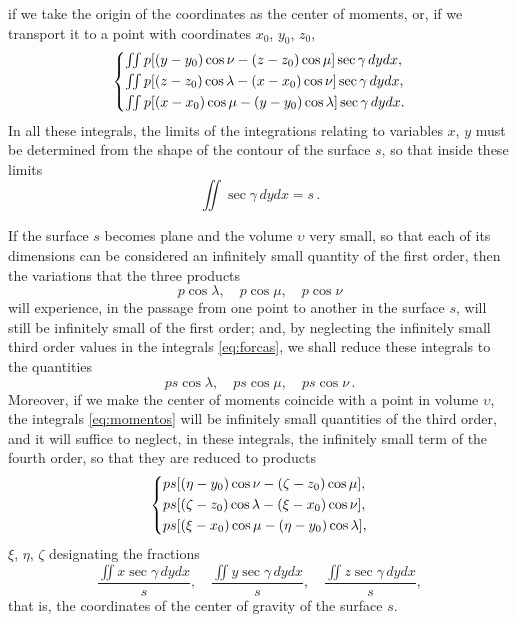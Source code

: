 \documentclass[leqno,openright,smallroyalvopaper,8pt,twoside,showtrims]{memoir}
\begin{document}
if we take the origin of the coordinates as the center of moments, or, if we transport it to a point with coordinates $x_0$, $y_0$, $z_0$, 
 \begin{equation}\label{eq:momentos}
   \begin{dcases}
     \textstyle\iint   p[(y-y_0)\cos\nu-(z-z_0)\cos\mu]\sec\gamma\, dydx,\\
     \textstyle\iint   p[(z-z_0)\cos\lambda-(x-x_0)\cos\nu]\sec\gamma\, dydx,\\
     \textstyle\iint   p[(x-x_0)\cos\mu-(y-y_0)\cos\lambda]\sec\gamma\, dydx.
   \end{dcases}
 \end{equation}
 In all these integrals, the limits of the integrations relating to variables $x$, $y$ must be determined from the shape of the contour of the surface $s$, so that inside these limits 
\begin{equation}
\textstyle\iint\sec\gamma\, dydx = s\,.
\end{equation}

If the surface $s$ becomes plane and the volume $\upsilon$ very small, so that each of its dimensions can be considered an infinitely small quantity of the first order, then the variations that the three products
\begin{equation}
p\cos\lambda,\quad p\cos\mu,\quad p\cos\nu
\end{equation}
will experience, in the passage from one point to another in the surface $s$, will still be infinitely small of the first order; and, by neglecting the infinitely small third order values in the integrals \eqref{eq:forcas}, we shall reduce these integrals to the quantities
\begin{equation}\label{eq:ps}
ps\cos\lambda,\quad ps\cos\mu,\quad ps\cos\nu\,.
\end{equation}
Moreover, if we make the center of moments coincide with a point in volume $\upsilon$, the integrals \eqref{eq:momentos} will be infinitely small quantities of the third order, and it will suffice to neglect, in these integrals, the infinitely small term of the fourth order, so that they are reduced to products
 \begin{equation}\label{eq:ps2}
   \begin{dcases}
        ps[(\eta-y_0)\cos\nu-(\zeta-z_0)\cos\mu],\\
       ps[(\zeta-z_0)\cos\lambda-(\xi-x_0)\cos\nu],\\
        ps[(\xi-x_0)\cos\mu-(\eta-y_0)\cos\lambda],
   \end{dcases}
 \end{equation}
 $\xi$, $\eta$, $\zeta$ designating the fractions
 \begin{equation}
 \dfrac{\textstyle\iint x\sec\gamma\, dydx}{s},\quad  \dfrac{\textstyle\iint y\sec\gamma\, dydx}{s},\quad  \dfrac{\textstyle\iint z\sec\gamma\, dydx}{s},
 \end{equation}
that is, the coordinates of the center of gravity of the surface $s$.
\end{document}
